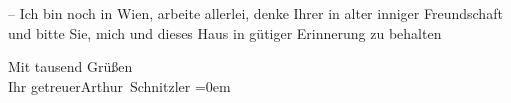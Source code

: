 \pstart
           – Ich bin noch in Wien, arbeite allerlei, denke
               Ihrer in alter inniger Freundschaft und bitte Sie, mich und {\pb}dieses Haus in gütiger Erinnerung zu behalten\pend
           
\pstart
           Mit tausend Grüßen{\\[\baselineskip]}Ihr getreuer\spacefill\mbox{Arthur Schnitzler}\pend
           \leftskip=0em{}\endnumbering{}  
      